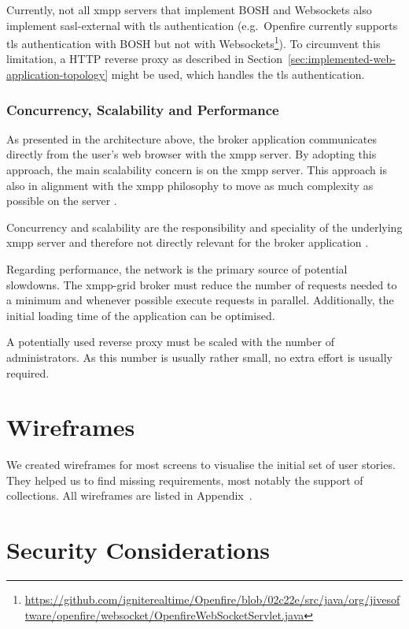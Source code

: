 Currently, not all \gls{xmpp} servers that implement BOSH and Websockets also implement \gls{sasl-external} with \gls{tls} authentication
(e.g.\ Openfire currently supports \gls{tls} authentication with BOSH but not with Websockets\footnote{\url{https://github.com/igniterealtime/Openfire/blob/02c22e/src/java/org/jivesoftware/openfire/websocket/OpenfireWebSocketServlet.java}}).
To circumvent this limitation, a HTTP reverse proxy as described in Section~\ref{sec:implemented-web-application-topology} might be used, which handles the \gls{tls} authentication.

\subsubsection{Concurrency, Scalability and Performance}

As presented in the architecture above, the \gls{broker} application communicates directly from the user's web browser with the \gls{xmpp} server.
By adopting this approach, the main scalability concern is on the \gls{xmpp} server.
This approach is also in alignment with the \gls{xmpp} philosophy to move as much complexity as possible on the server \cite{definitive-guide-xmpp}.

Concurrency and scalability are the responsibility and speciality of the underlying \gls{xmpp} server and therefore not directly relevant for the \gls{broker} application \cite{definitive-guide-xmpp}.

Regarding performance, the network is the primary source of potential slowdowns.
The \gls{xmpp-grid} \gls{broker} must reduce the number of requests needed to a minimum and whenever possible execute requests in parallel.
Additionally, the initial loading time of the application can be optimised.

A potentially used reverse proxy must be scaled with the number of administrators.
As this number is usually rather small, no extra effort is usually required.

\section{Wireframes}

We created wireframes for most screens to visualise the initial set of user stories.
They helped us to find missing requirements, most notably the support of collections.
All wireframes are listed in Appendix~.

\section{Security Considerations}\label{sec:security-considerations}

